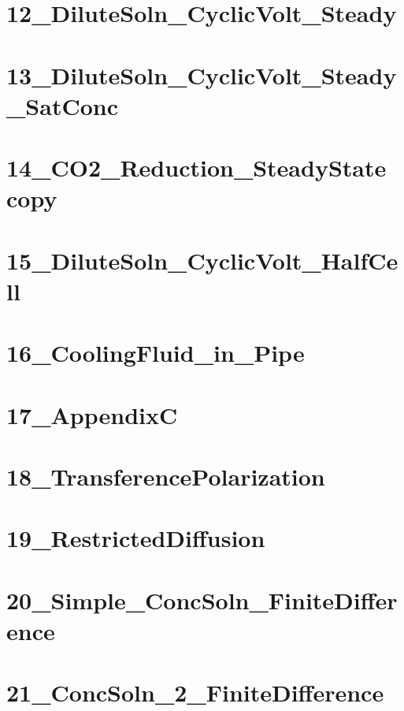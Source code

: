 \documentclass[12pt]{article}
\begin{document}
	\clearpage
	\section*{12\_DiluteSoln\_CyclicVolt\_Steady}

	\clearpage
	\section*{13\_DiluteSoln\_CyclicVolt\_Steady\_SatConc}

	\clearpage
	\section*{14\_CO2\_Reduction\_SteadyState copy}

	\clearpage
	\section*{15\_DiluteSoln\_CyclicVolt\_HalfCell}

	\clearpage
	\section*{16\_CoolingFluid\_in\_Pipe}

	\clearpage
	\section*{17\_AppendixC}

	\clearpage
	\section*{18\_TransferencePolarization}

	\clearpage
	\section*{19\_RestrictedDiffusion}

	\clearpage
	\section*{20\_Simple\_ConcSoln\_FiniteDifference}

	\clearpage
	\section*{21\_ConcSoln\_2\_FiniteDifference}

	\clearpage
\end{document}
